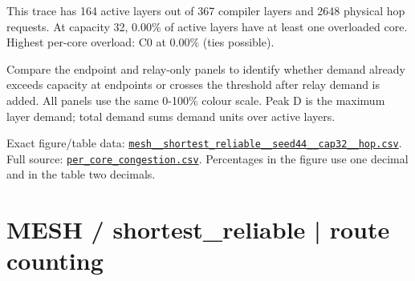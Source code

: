 \documentclass[10pt,a4paper]{article}
\begin{document}
This trace has 164 active layers out of 367 compiler layers and 2648 physical hop requests. At capacity 32, 0.00\% of active layers have at least one overloaded core. Highest per-core overload: C0 at 0.00\% (ties possible).\par
Compare the endpoint and relay-only panels to identify whether demand already exceeds capacity at endpoints or crosses the threshold after relay demand is added. All panels use the same 0-100\% colour scale. Peak D is the maximum layer demand; total demand sums demand units over active layers.\par
Exact figure/table data: \href{\detokenize{file:///home/dhruv-pansuriya/Documents/BTP/Compiler-Driven-ACE/output/pdf/qaoa_methods_congestion/tables/mesh__shortest_reliable__seed44__cap32__hop.csv}}{\nolinkurl{mesh__shortest_reliable__seed44__cap32__hop.csv}}. Full source: \href{\detokenize{file:///home/dhruv-pansuriya/Documents/BTP/Compiler-Driven-ACE/results/qaoa_2seed_2026-10-26/congestion/per_core_congestion.csv}}{\nolinkurl{per_core_congestion.csv}}. Percentages in the figure use one decimal and in the table two decimals.\par
\clearpage
\section*{MESH / shortest\_reliable | route counting}
\end{document}
